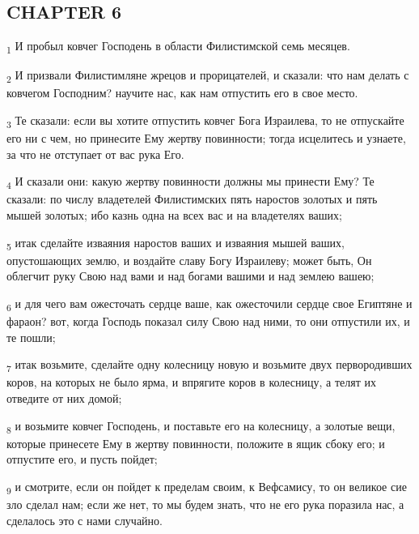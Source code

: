 \subsection{CHAPTER 6}
\begin{tcolorbox}
\textsubscript{1} И пробыл ковчег Господень в области Филистимской семь месяцев.
\end{tcolorbox}
\begin{tcolorbox}
\textsubscript{2} И призвали Филистимляне жрецов и прорицателей, и сказали: что нам делать с ковчегом Господним? научите нас, как нам отпустить его в свое место.
\end{tcolorbox}
\begin{tcolorbox}
\textsubscript{3} Те сказали: если вы хотите отпустить ковчег Бога Израилева, то не отпускайте его ни с чем, но принесите Ему жертву повинности; тогда исцелитесь и узнаете, за что не отступает от вас рука Его.
\end{tcolorbox}
\begin{tcolorbox}
\textsubscript{4} И сказали они: какую жертву повинности должны мы принести Ему? Те сказали: по числу владетелей Филистимских пять наростов золотых и пять мышей золотых; ибо казнь одна на всех вас и на владетелях ваших;
\end{tcolorbox}
\begin{tcolorbox}
\textsubscript{5} итак сделайте изваяния наростов ваших и изваяния мышей ваших, опустошающих землю, и воздайте славу Богу Израилеву; может быть, Он облегчит руку Свою над вами и над богами вашими и над землею вашею;
\end{tcolorbox}
\begin{tcolorbox}
\textsubscript{6} и для чего вам ожесточать сердце ваше, как ожесточили сердце свое Египтяне и фараон? вот, когда Господь показал силу Свою над ними, то они отпустили их, и те пошли;
\end{tcolorbox}
\begin{tcolorbox}
\textsubscript{7} итак возьмите, сделайте одну колесницу новую и возьмите двух первородивших коров, на которых не было ярма, и впрягите коров в колесницу, а телят их отведите от них домой;
\end{tcolorbox}
\begin{tcolorbox}
\textsubscript{8} и возьмите ковчег Господень, и поставьте его на колесницу, а золотые вещи, которые принесете Ему в жертву повинности, положите в ящик сбоку его; и отпустите его, и пусть пойдет;
\end{tcolorbox}
\begin{tcolorbox}
\textsubscript{9} и смотрите, если он пойдет к пределам своим, к Вефсамису, то он великое сие зло сделал нам; если же нет, то мы будем знать, что не его рука поразила нас, а сделалось это с нами случайно.
\end{tcolorbox}
